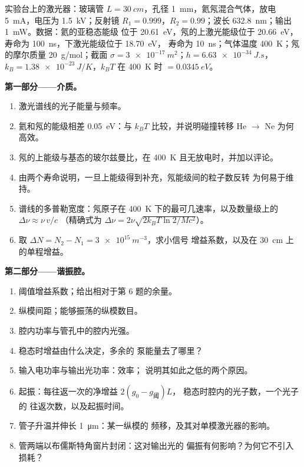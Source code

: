 \begin{problem}\label{pb:b2:laser:1}
实验台上的激光器：玻璃管 $L = \qty{30}{cm}$，孔径
\qty{1}{mm}，氦氖混合气体，放电 \qty{5}{mA}，电压为
\qty{1.5}{kV}；反射镜 $R_1 = 0.999$，$R_2 = 0.99$；波长
\qty{632.8}{nm}；输出 \qty{1}{mW}。数据：氦的亚稳态能级
位于 \qty{20.61}{eV}，氖的上激光能级位于 \qty{20.66}{eV}，
寿命为 \qty{100}{ns}，下激光能级位于 \qty{18.70}{eV}，
寿命为 \qty{10}{ns}；气体温度 \qty{400}{K}；氖的摩尔质量
\qty{20}{g/mol}；截面 $\sigma = \qty{3e-17}{m^2}$；$h =
\qty{6.63e-34}{J.s}$，$k_B = \qty{1.38e-23}{J/K}$，$k_BT$ 在 \qty{400}{K} 时
$= \qty{0.0345}{eV}$。

\textbf{第一部分——介质。}
\begin{enumerate}
  \item 激光谱线的光子能量与频率。
  \item 氦和氖的能级相差 \qty{0.05}{eV}：与
        $k_BT$ 比较，并说明碰撞转移 He $\to$ Ne 为何
        高效。
  \item 氖的上能级与基态的玻尔兹曼比，在
        \qty{400}{K} 且无放电时，并加以评论。
  \item 由两个寿命说明，一旦上能级得到补充，氖能级间的粒子数反转
        为何易于维持。
  \item 谱线的多普勒宽度：氖原子在
        \qty{400}{K} 下的最可几速率，以及数量级上的 $\Delta\nu \approx \nu\,v/c$
        （精确式为 $\Delta\nu = 2\nu\sqrt{2k_BT\ln2/Mc^2}$）。
  \item 取 $\Delta N = N_2 - N_1 = \qty{3e15}{m^{-3}}$，求小信号
        增益系数，以及在 \qty{30}{cm} 上的单程增益。
\end{enumerate}

\textbf{第二部分——谐振腔。}
\begin{enumerate}[resume]
  \item 阈值增益系数；给出相对于第 6 题的余量。
  \item 纵模间距；能够振荡的纵模数目。
  \item 腔内功率与管孔中的腔内光强。
  \item 稳态时增益由什么决定，多余的
        泵能量去了哪里？
  \item 输入电功率与输出光功率：效率；
        说明其如此之低的两个原因。
  \item 起振：每往返一次的净增益 $2(g_0 - g_{\text{阈}})L$，
        稳态时腔内的光子数，一个光子的
        往返次数，以及起振时间。
  \item 管子升温并伸长 \qty{1}{\micro m}：某一纵模的
        频移，及其对单模激光器的影响。
  \item 管两端以布儒斯特角窗片封闭：这对输出光的
        偏振有何影响？为何它不引入
        损耗？
\end{enumerate}


\end{problem}
